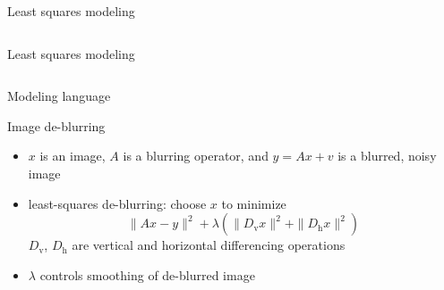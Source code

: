\documentclass[11pt,mathserif]{beamer}
\begin{document}
\begin{frame}{Least squares modeling}
\inputminted{haskell}{app/example1.hs}
\end{frame}

\begin{frame}{Least squares modeling}
\inputminted{haskell}{app/example2.hs}
\end{frame}

\begin{frame}{Modeling language}
\vfill
{}
\vfill
\end{frame}

\begin{frame}{Image de-blurring}
\begin{itemize}
\item $x$ is an image, $A$ is a blurring operator, and $y=Ax+v$
is a blurred, noisy image
\item least-squares de-blurring: choose $x$ to minimize
\[
 \|Ax -  y\|^2 + \lambda (\|D_\mathrm v x\|^2 + \|D_\mathrm h x\|^2)
\]
$D_\mathrm v$, $D_\mathrm h$ are vertical and horizontal
differencing operations
\item $\lambda$ controls smoothing of de-blurred image
\end{itemize}

\inputminted{haskell}{app/example3.hs}
\end{frame}
\end{document}
